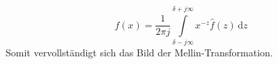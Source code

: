 \begin{equation}
    f(x) = \frac{1}{2\pi j} \int\limits_{\delta -j\infty}^{\delta +j\infty} x^{-z} \hat{f}(z) \,\mathrm{d}z
    \label{mellin:mellininv}
\end{equation}
Somit vervollständigt sich das Bild der Mellin-Transformation.











